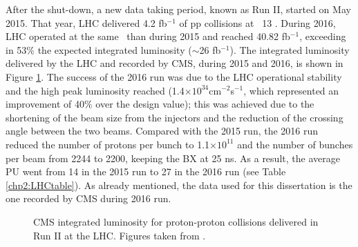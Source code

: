\noindent After the shut-down, a new data taking period, known as Run II, started on May 
2015. That year, LHC delivered 4.2 fb$^{-1}$ of pp collisions at \sqrts~13 \TeV. During 2016, LHC 
operated at the same \centermassenergy~than during 2015 and reached 40.82 fb$^{-1}$, exceeding  in 53$\%$ the expected integrated 
luminosity ($\sim$26 fb$^{-1}$). The integrated luminosity delivered by the LHC and recorded by CMS, 
during 2015 and 2016, is shown in Figure \ref{figchp2:luminosityRunII}. The success of the 2016 run was due to
the LHC operational stability and the high peak luminosity reached (1.4$\times10^{34}$cm$^{-2}$s$^{-1}$, which represented 
an improvement of 40$\%$ over the design value); this was achieved due to 
the shortening of the beam size from the injectors and the reduction of the 
crossing angle between the two beams. Compared with the 2015 run, the 2016 run 
reduced the number of protons per bunch to 1.1$\times10^{11}$ and the number of bunches per beam 
from 2244 to 2200, keeping the BX at 25 ns. As a result, the average
PU went from 14 in the 2015 run to 27 in the 2016 run (see Table \ref{chp2:LHCtable}). As already mentioned, 
the data used for this dissertation is the one recorded by CMS during 2016 run.
\begin{figure}[ht]
    \begin{center}
      \caption{CMS integrated luminosity for proton-proton collisions delivered
      in Run II at the LHC. Figures taken from \cite{chp2:LHCluminosity}.}
     \label{figchp2:luminosityRunII}
    \end{center}
\end{figure}

